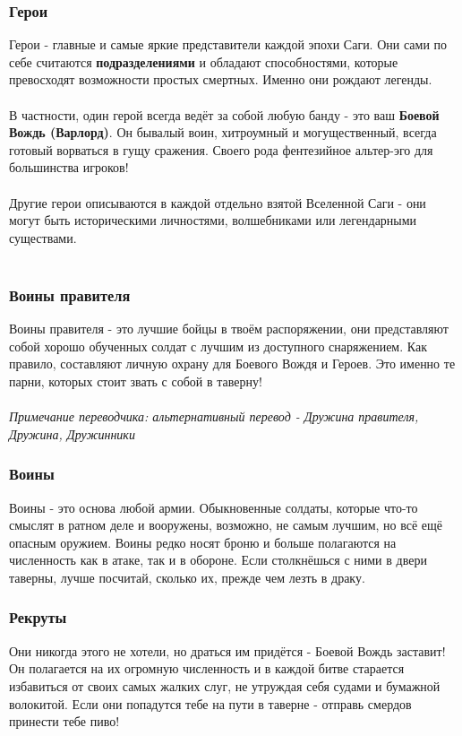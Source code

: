 \documentclass[a4paper,11pt,twoside]{article}
\begin{document}
\subsubsection*{Герои}
Герои - главные и самые яркие представители каждой эпохи Саги. Они сами по себе считаются \textbf{подразделениями} и обладают способностями, которые превосходят возможности простых смертных. Именно они рождают легенды. \\ \\
В частности, один герой всегда ведёт за собой любую банду - это ваш \textbf{Боевой Вождь (Варлорд)}. Он бывалый воин, хитроумный и могущественный, всегда готовый ворваться в гущу сражения. Своего рода фентезийное альтер-эго для большинства игроков! \\ \\
Другие герои описываются в каждой отдельно взятой Вселенной Саги - они могут быть историческими личностями, волшебниками или легендарными существами. \\ \\
\subsubsection*{Воины правителя} 
Воины правителя - это лучшие бойцы в твоём распоряжении, они представляют собой хорошо обученных солдат с лучшим из доступного снаряжением. Как правило, составляют личную охрану для Боевого Вождя и Героев. Это именно те парни, которых стоит звать с собой в таверну!
\\ \\
\textit{Примечание переводчика: альтернативный перевод - Дружина правителя, Дружина, Дружинники}
\subsubsection*{Воины}

Воины - это основа любой армии. Обыкновенные солдаты, которые что-то смыслят в ратном деле и вооружены, возможно, не самым лучшим, но всё ещё опасным оружием. Воины редко носят броню и больше полагаются на численность как в атаке, так и в обороне. Если столкнёшься с ними в двери таверны, лучше посчитай, сколько их, прежде чем лезть в драку.

\subsubsection*{Рекруты}

Они никогда этого не хотели, но драться им придётся - Боевой Вождь заставит! Он полагается на их огромную численность и в каждой битве старается избавиться от своих самых жалких слуг, не утруждая себя судами и бумажной волокитой. Если они попадутся тебе на пути в таверне - отправь смердов принести тебе пиво!
\end{document}
